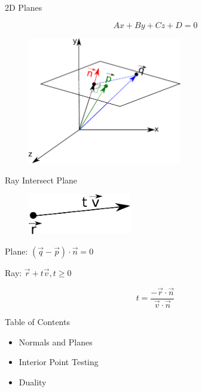 \documentclass{beamer}
\begin{document}
\begin{frame}{2D Planes}

\[Ax + By + Cz + D = 0 \]

\begin{figure}[t]
	\centering
	\includegraphics[width=0.6\textwidth]{PlaneNormalForm.pdf}
\end{figure}


\end{frame}


\begin{frame}{Ray Intersect Plane}

\begin{figure}[t]
	\centering
	\includegraphics[width=0.4\textwidth]{ray.pdf}
\end{figure}

Plane: $ (\vec{q} - \vec{p}) \cdot \vec{n} = 0 $

Ray: $ \vec{r} + t \vec{v}, t \geq 0 $

\[ t = \frac{ - \vec{r} \cdot \vec{n}}{\vec{v} \cdot \vec{n}}\]

\end{frame}




\begin{frame}{Table of Contents}

\begin{itemize}[label=$\vartriangleright$]
	\item Normals and Planes
\end{itemize}
\begin{itemize}[label=$\blacktriangleright$]
    \item Interior Point Testing
\end{itemize}
\begin{itemize}[label=$\vartriangleright$]
    \item Duality
\end{itemize}

\end{frame}
\end{document}
